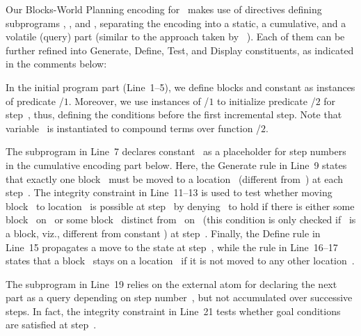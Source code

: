 Our Blocks-World Planning encoding for \clingo\ makes use of  directives
defining subprograms , , and ,
separating the encoding into a static, a cumulative, and a volatile (query) part
(similar to the approach taken by \iclingo~\cite{gekakaosscth08a}).
Each of them can be further refined into Generate, Define, Test, and Display constituents, 
as indicated in the comments below:
%

%
In the initial program  part (Line~1--5),
we define blocks and constant 
as instances of predicate /$1$.
Moreover, we use instances of /$1$
to initialize predicate /$2$ for step~, thus,
defining the conditions before the first incremental step.
Note that variable~ is instantiated to compound terms
over function /$2$.

The  subprogram in Line~7 declares constant~
as a placeholder for step numbers in the cumulative encoding part below.
Here, the Generate rule in Line~9 states that exactly one block~
must be moved to a location~ (different from~) at each step~.
The integrity constraint in Line~11--13 is used to test whether
moving block~ to location~ is possible at step~
by denying~ to hold if there
is either some block~ on~ or some block~ distinct from~ on~
(this condition is only checked if~ is a block, viz., different from constant )
at step~.
Finally, the Define rule in Line~15 propagates
a move to the state at step~,
while the rule in Line~16--17 states that a block~ stays on a location~
if it is not moved to any other location~.

The  subprogram in Line~19 relies on the external atom  
for declaring the next part as a query depending on step number~, 
but not accumulated over successive steps.
In fact, the integrity constraint in Line~21 tests whether goal conditions are
satisfied at step~.


